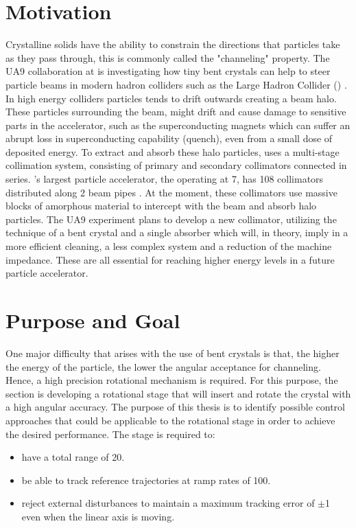 \section{Motivation}
Crystalline solids have the ability to constrain the directions that particles take as they pass through, this is commonly called the "channeling" property. The UA9 collaboration at \abbrCERN is investigating how tiny bent crystals can help to steer particle beams in modern hadron colliders such as the Large Hadron Collider (\abbrLHC) \citep{scandale2016observation}. In high energy colliders particles tends to drift outwards creating a beam halo. These particles surrounding the beam, might drift and cause damage to sensitive parts in the accelerator, such as the superconducting magnets which can suffer an abrupt loss in superconducting capability (quench), even from a small dose of deposited energy. To extract and absorb these halo particles, \abbrCERN uses a multi-stage collimation system, consisting of primary and secondary collimators connected in series. \abbrCERN's largest particle accelerator, the \abbrLHC operating at \unit{7}{\tera\electronvolt}, has 108 collimators distributed along 2 beam pipes \citep{CrystalCollimation:2015}. At the moment, these collimators use massive blocks of amorphous material to intercept with the beam and absorb halo particles. The UA9 experiment plans to develop a new collimator, utilizing the technique of a bent crystal and a single absorber which will, in theory, imply in a more efficient cleaning, a less complex system and a reduction of the machine impedance. These are all essential for reaching higher energy levels in a future particle accelerator.

\section{Purpose and Goal}
One major difficulty that arises with the use of bent crystals is that, the higher the energy of the particle, the lower the angular acceptance for channeling. Hence, a high precision rotational mechanism is required. For this purpose, the \abbrENSTIECE section is developing a rotational stage that will insert and rotate the crystal with a high angular accuracy. The purpose of this thesis is to identify possible control approaches that could be applicable to the rotational stage in order to achieve the desired performance. The stage is required to:
\begin{itemize}
  \item have a total range of \unit{20}{\milli\rad}.
  \item be able to track reference trajectories at ramp rates of \unit{100}{\micro\radianpersecond}.
  \item reject external disturbances to maintain a maximum tracking error of $\pm$\unit{1}{\micro\rad} even when the linear axis is moving.
\end{itemize}

